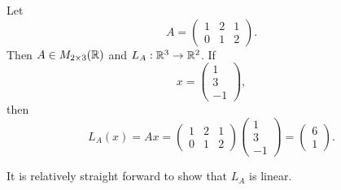 \begin{eg}
    Let 
    \[  A = \begin{pmatrix}
        1 & 2 & 1 \\
        0 & 1 & 2 
    \end{pmatrix}. \]
    Then \( A \in {M}_{2 \times 3 }(\mathbb{R}) \) and \( {L}_{A}: \mathbb{R}^{3} \to \mathbb{R}^{2} \). If 
    \[  x = \begin{pmatrix}
        1  \\
        3  \\
        -1 
    \end{pmatrix}, \]
    then
    \[  {L}_{A}(x) = Ax = \begin{pmatrix}
        1 & 2 & 1 \\
        0 & 1 & 2 
    \end{pmatrix} \begin{pmatrix}
        1 \\
        3 \\
        -1 
    \end{pmatrix} = \begin{pmatrix}
        6 \\
        1 
    \end{pmatrix}.  \]
\end{eg}

\begin{remark}
   It is relatively straight forward to show that \( {L}_{A} \) is linear. 
\end{remark}

